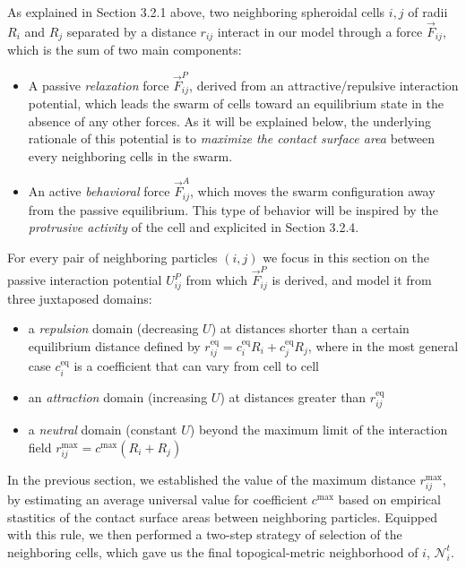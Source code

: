 As explained in Section 3.2.1 above, two neighboring spheroidal cells $i,j$ of radii $R_i$ and $R_j$ separated by a distance $r_{ij}$ interact in our model through a force $\vec{F}_{ij}$, which is the sum of two main components:
\begin{itemize}
	\item A passive \textit{relaxation} force $\vec{F}^P_{ij}$, derived from an attractive/repulsive interaction potential, which leads the swarm of cells toward an equilibrium state in the absence of any other forces. As it will be explained below, the underlying rationale of this potential is to \textit{maximize the contact surface area} between every neighboring cells in the swarm.
	\item An active \textit{behavioral} force $\vec{F}^A_{ij}$, which moves the swarm configuration away from the passive equilibrium. This type of behavior will be inspired by the \textit{protrusive activity} of the cell and explicited in Section 3.2.4.
\end{itemize}

For every pair of neighboring particles $(i,j)$ we focus in this section on the passive interaction potential ${U}^P_{ij}$ from which $\vec{F}^P_{ij}$ is derived, and model it from three juxtaposed domains:  
\begin{itemize}
	\item a \textit{repulsion} domain (decreasing $U$) at distances shorter than a certain equilibrium distance defined by $r^{\mathrm{eq}}_{ij} = c^{\mathrm{eq}}_{i}R_i + c^{\mathrm{eq}}_{j}R_j$, where in the most general case $c^{\mathrm{eq}}_i$ is a coefficient that can vary from cell to cell
	\item an \textit{attraction} domain (increasing $U$) at distances greater than $r^{\mathrm{eq}}_{ij}$
	\item a \textit{neutral} domain (constant $U$) beyond the maximum limit of the interaction field $r^{\mathrm{max}}_{ij} = c^{\mathrm{max}}(R_i+R_j)$
\end{itemize}

In the previous section, we established the value of the maximum distance $r^{\mathrm{max}}_{ij}$, by estimating an average universal value for coefficient $c^{\mathrm{max}}$ based on empirical stastitics of the contact surface areas between neighboring particles. Equipped with this rule, we then performed a two-step strategy of selection of the neighboring cells, which gave us the final topogical-metric neighborhood of $i$, $\mathcal{N}^t_i$.

